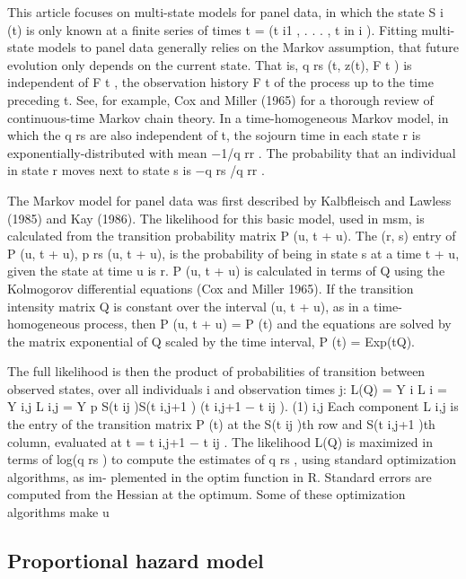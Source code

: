 \documentclass[10pt,a4paper]{article}
\begin{document}
This article focuses on multi-state models for panel data, in which the state S i (t) is only
known at a finite series of times t = (t i1 , . . . , t in i ). Fitting multi-state models to panel data
generally relies on the Markov assumption, that future evolution only depends on the current
state. That is, q rs (t, z(t), F t ) is independent of F t , the observation history F t of the process
up to the time preceding t. See, for example, Cox and Miller (1965) for a thorough review of
continuous-time Markov chain theory. In a time-homogeneous Markov model, in which the
q rs are also independent of t, the sojourn time in each state r is exponentially-distributed
with mean −1/q rr . The probability that an individual in state r moves next to state s is
−q rs /q rr .

The Markov model for panel data was first described by Kalbfleisch and Lawless (1985)
and Kay (1986). The likelihood for this basic model, used in msm, is calculated from the
transition probability matrix P (u, t + u). The (r, s) entry of P (u, t + u), p rs (u, t + u), is the
probability of being in state s at a time t + u, given the state at time u is r. P (u, t + u) is
calculated in terms of Q using the Kolmogorov differential equations (Cox and Miller 1965).
If the transition intensity matrix Q is constant over the interval (u, t + u), as in a time-
homogeneous process, then P (u, t + u) = P (t) and the equations are solved by the matrix
exponential of Q scaled by the time interval,
P (t) = Exp(tQ).

The full likelihood is then the product of probabilities of transition between observed states,
over all individuals i and observation times j:
L(Q) =
Y
i
L i =
Y
i,j
L i,j =
Y
p S(t ij )S(t i,j+1 ) (t i,j+1 − t ij ).
(1)
i,j
Each component L i,j is the entry of the transition matrix P (t) at the S(t ij )th row and
S(t i,j+1 )th column, evaluated at t = t i,j+1 − t ij . The likelihood L(Q) is maximized in terms
of log(q rs ) to compute the estimates of q rs , using standard optimization algorithms, as im-
plemented in the optim function in R. Standard errors are computed from the Hessian at the
optimum. Some of these optimization algorithms make u

\paragraph{}

\subsection{Proportional hazard model}
\end{document}
